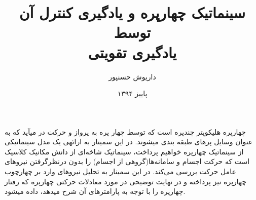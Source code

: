 \documentclass[10pt,a4paper]{article}
\newcommand{\نیمفاصله}{\halfspace}
\renewcommand{\ }{\halfspace}
\begin{document}
\title{سینماتیک چهارپره و یادگیری کنترل آن توسط\\یادگیری تقویتی}
\author{داریوش حسن\ پور}
\date{پاییز ۱۳۹۴}
\maketitle
چهارپره هلیکوپتر چندپره است که توسط چهار پره به پرواز و حرکت در می\ آید که به عنوان وسایل پره\ ای طبقه بندی می\ شوند.
در این سمینار به ارائه\ ی یک مدل سینماتیکی از سینماتیک چهارپره خواهیم پرداخت، سینماتیک شاخه‌ای از دانش مکانیک کلاسیک است که حرکت اجسام و سامانه‌ها(گروهی از اجسام) را بدون درنظرگرفتن نیروهای عامل حرکت بررسی می‌کند. در این سمینار به تحلیل نیروهای وارد بر چهارچوب چهارپره نیز پرداخته و در نهایت توضیحی در مورد معادلات حرکتی چهارپره که رفتار چهارپره را با توجه به پارامترهای آن شرح می\ دهد، داده می\ شود.
\end{document}
